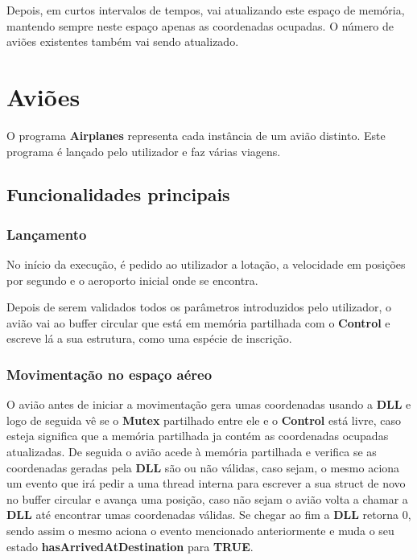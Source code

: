 \documentclass[11pt]{article}
\begin{document}
	Depois, em curtos intervalos de tempos, vai atualizando este espaço de memória, mantendo sempre neste espaço apenas as coordenadas ocupadas. O número de aviões existentes também vai sendo atualizado.
	
	
	\large
	\section{Aviões}
	\normalsize
	
	O programa \textbf{Airplanes} representa cada instância de um avião distinto. Este programa é lançado pelo utilizador e faz várias viagens. 
	
	
	\large
	\subsection{Funcionalidades principais}
	\subsubsection{Lançamento}
	\normalsize
	
	No início da execução, é pedido ao utilizador a lotação, a velocidade em posições por segundo e o aeroporto inicial onde se encontra.
	
	Depois de serem validados todos os parâmetros introduzidos pelo utilizador, o avião vai ao buffer circular que está em memória partilhada com o \textbf{Control} e escreve lá a sua estrutura, como uma espécie de inscrição.
	
	
	\large
	\subsubsection{Movimentação no espaço aéreo}
	\normalsize
	
	O avião antes de iniciar a movimentação gera umas coordenadas usando a \textbf{DLL} e logo de seguida vê se o \textbf{Mutex} partilhado entre ele e o \textbf{Control} está livre, caso esteja significa que a memória partilhada ja contém as coordenadas ocupadas atualizadas. De seguida o avião acede à memória partilhada e verifica se as coordenadas geradas pela \textbf{DLL} são ou não válidas, caso sejam, o mesmo aciona um evento que irá pedir a uma thread interna para escrever a sua struct de novo no buffer circular e avança uma posição, caso não sejam o avião volta a chamar a \textbf{DLL} até encontrar umas coordenadas válidas. Se chegar ao fim a \textbf{DLL} retorna 0, sendo assim o mesmo aciona o evento mencionado anteriormente e muda o seu estado \textbf{hasArrivedAtDestination} para \textbf{TRUE}.
	
\end{document}
